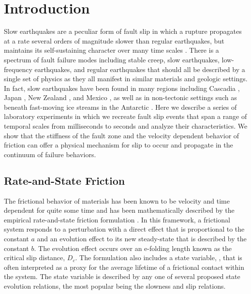 \section{Introduction}
Slow earthquakes are a peculiar form of fault slip in which a rupture propagates at a rate several orders of magnitude slower than regular earthquakes, but maintains its self-sustaining character over many time scales \cite{linde1996san,obara2002nonvolcanic,rogers2003episodic,ide2007scaling,shelly2007non,peng2010integrated}. There is a spectrum of fault failure modes including stable creep, slow earthquakes, low-frequency earthquakes, and regular earthquakes that should all be described by a single set of physics as they all manifest in similar materials and geologic settings. In fact, slow earthquakes have been found in many regions including Cascadia \cite[e.g.][]{rogers2003episodic}, Japan \cite[e.g.][]{obara2002nonvolcanic}, New Zealand \cite[e.g.][]{Wallace2006}, and Mexico \cite[e.g.][]{Kostoglodov2003}, as well as in non-tectonic settings such as beneath fast-moving ice streams in the Antarctic \cite[e.g.][]{anandakrishnan1993micro}.  Here we describe a series of laboratory experiments in which we recreate fault slip events that span a range of temporal scales from milliseconds to seconds and analyze their characteristics. We show that the stiffness of the fault zone and the velocity dependent behavior of friction can offer a physical mechanism for slip to occur and propagate in the continuum of failure behaviors.
 
\subsection{Rate-and-State Friction}
The frictional behavior of materials has been known to be velocity and time dependent for quite some time and has been mathematically described by the empirical rate-and-state friction formulation \cite{RABINOWICZ1951, dieterich1972time, dieterich1978time, Ruina1983, marone1998laboratory}. In this framework, a frictional system responds to a perturbation with a direct effect that is proportional to the constant $a$ and an evolution effect to its new steady-state that is described by the constant $b$. The evolution effect occurs over an e-folding length known as the critical slip distance, $D_c$. The formulation also includes a state variable, , that is often interpreted as a proxy for the average lifetime of a frictional contact within the system. The state variable is described by any one of several proposed state evolution relations, the most popular being the slowness and slip relations. 


